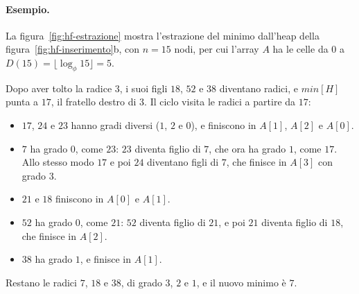 \paragraph{Esempio.}
La figura~\ref{fig:hf-estrazione} mostra l'estrazione del minimo dall'heap della figura~\ref{fig:hf-inserimento}b, con $n = 15$ nodi, per cui l'array $A$ ha le celle da $0$ a $D(15) = \lfloor \log_\phi 15 \rfloor = 5$.

Dopo aver tolto la radice $3$, i suoi figli $18$, $52$ e $38$ diventano radici, e $\mathit{min}[H]$ punta a $17$, il fratello destro di $3$. Il ciclo visita le radici a partire da $17$:
\begin{itemize}
    \item $17$, $24$ e $23$ hanno gradi diversi ($1$, $2$ e $0$), e finiscono in $A[1]$, $A[2]$ e $A[0]$.
    \item $7$ ha grado $0$, come $23$: $23$ diventa figlio di $7$, che ora ha grado $1$, come $17$. Allo stesso modo $17$ e poi $24$ diventano figli di $7$, che finisce in $A[3]$ con grado $3$.
    \item $21$ e $18$ finiscono in $A[0]$ e $A[1]$.
    \item $52$ ha grado $0$, come $21$: $52$ diventa figlio di $21$, e poi $21$ diventa figlio di $18$, che finisce in $A[2]$.
    \item $38$ ha grado $1$, e finisce in $A[1]$.
\end{itemize}
Restano le radici $7$, $18$ e $38$, di grado $3$, $2$ e $1$, e il nuovo minimo è $7$.

